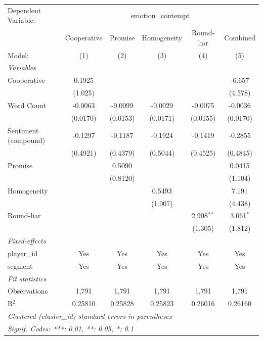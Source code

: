 
\begingroup
\centering
\begin{tabular}{lccccc}
   \tabularnewline \midrule \midrule
   Dependent Variable: & \multicolumn{5}{c}{emotion\_contempt}\\
                        & Cooperative & Promise  & Homogeneity & Round-liar   & Combined \\   
   Model:               & (1)         & (2)      & (3)         & (4)          & (5)\\  
   \midrule
   \emph{Variables}\\
   Cooperative          & 0.1925      &          &             &              & -6.657\\   
                        & (1.025)     &          &             &              & (4.578)\\   
   Word Count           & -0.0063     & -0.0099  & -0.0029     & -0.0075      & -0.0036\\   
                        & (0.0170)    & (0.0153) & (0.0171)    & (0.0155)     & (0.0170)\\   
   Sentiment (compound) & -0.1297     & -0.1187  & -0.1924     & -0.1419      & -0.2855\\   
                        & (0.4921)    & (0.4379) & (0.5044)    & (0.4525)     & (0.4845)\\   
   Promise              &             & 0.5090   &             &              & 0.0415\\   
                        &             & (0.8120) &             &              & (1.104)\\   
   Homogeneity          &             &          & 0.5493      &              & 7.191\\   
                        &             &          & (1.007)     &              & (4.438)\\   
   Round-liar           &             &          &             & 2.908$^{**}$ & 3.061$^{*}$\\   
                        &             &          &             & (1.305)      & (1.812)\\   
   \midrule
   \emph{Fixed-effects}\\
   player\_id           & Yes         & Yes      & Yes         & Yes          & Yes\\  
   segment              & Yes         & Yes      & Yes         & Yes          & Yes\\  
   \midrule
   \emph{Fit statistics}\\
   Observations         & 1,791       & 1,791    & 1,791       & 1,791        & 1,791\\  
   R$^2$                & 0.25810     & 0.25828  & 0.25823     & 0.26016      & 0.26160\\  
   \midrule \midrule
   \multicolumn{6}{l}{\emph{Clustered (cluster\_id) standard-errors in parentheses}}\\
   \multicolumn{6}{l}{\emph{Signif. Codes: ***: 0.01, **: 0.05, *: 0.1}}\\
\end{tabular}
\par\endgroup



